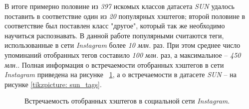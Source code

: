 \indent
\indent
В итоге примерно половине из  \textit{397}
искомых классов датасета \textit{SUN} удалось поставить
в соответствие один из \textit{20} популярных хэштегов; второй половине
в соответствие был поставлен класс "другое", который так же необходимо
научиться распознавать. В данной работе 
популярными считаются теги, использованные в сети
\textit{Instagram} более \textit{10 млн.} раз. При этом среднее число упоминаний 
отобранных тегов составило \textit{100 млн.} раз, а
максимальное -- \textit{450 млн.}. Полная информация о встречаемости
отобранных хэштегов в сети \textit{Instagram} приведена
на рисунке ~\ref{tikzpicture: tags_counts},
а о встречаемости в датасете \textit{SUN} -- на рисунке \ref{tikzpicture: sun_tags}.


\begin{center}
    \begin{figure}[h!]
    \caption{Встречаемость отобранных хэштегов в социальной сети \textit{Instagram}.}
    \label{tikzpicture: tags_counts}
    \end{figure}
\end{center}


